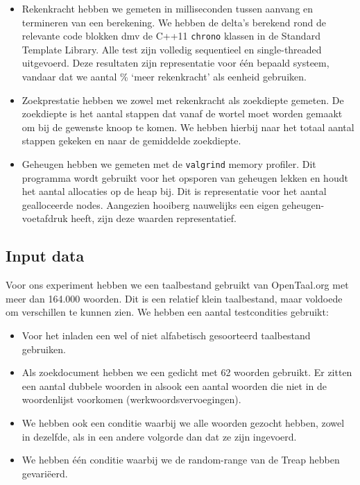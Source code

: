 \documentclass[a4paper,10pt]{article}
\begin{document}
\begin{itemize}
\item Rekenkracht hebben we gemeten in milliseconden tussen aanvang en termineren van een berekening. We hebben de delta's berekend rond de relevante code blokken dmv de C++11 \texttt{chrono} klassen in de Standard Template Library. Alle test zijn volledig sequentieel en single-threaded uitgevoerd. Deze resultaten zijn representatie voor \'e\'en bepaald systeem, vandaar dat we aantal \% `meer rekenkracht' als eenheid gebruiken.
\item Zoekprestatie hebben we zowel met rekenkracht als zoekdiepte gemeten. De zoekdiepte is het aantal stappen dat vanaf de wortel moet worden gemaakt om bij de gewenste knoop te komen. We hebben hierbij naar het totaal aantal stappen gekeken en naar de gemiddelde zoekdiepte.
\item Geheugen hebben we gemeten met de \texttt{valgrind} memory profiler. Dit programma wordt gebruikt voor het opsporen van geheugen lekken en houdt het aantal allocaties op de heap bij. Dit is representatie voor het aantal gealloceerde nodes. Aangezien hooiberg nauwelijks een eigen geheugen-voetafdruk heeft, zijn deze waarden representatief.
\end{itemize}

\subsection{Input data}

Voor ons experiment hebben we een taalbestand gebruikt van OpenTaal.org met meer dan 164.000 woorden. Dit is een relatief klein taalbestand, maar voldoede om verschillen te kunnen zien. We hebben een aantal testcondities gebruikt:
\begin{itemize}
\item Voor het inladen een wel of niet alfabetisch gesoorteerd taalbestand gebruiken.
\item Als zoekdocument hebben we een gedicht met 62 woorden gebruikt. Er zitten een aantal dubbele woorden in alsook een aantal woorden die niet in de woordenlijst voorkomen (werkwoordsvervoegingen).
\item We hebben ook een conditie waarbij we alle woorden gezocht hebben, zowel in dezelfde, als in een andere volgorde dan dat ze zijn ingevoerd.
\item We hebben \'e\'en conditie waarbij we de random-range van de Treap hebben gevari\"eerd.
\end{itemize}
\end{document}
